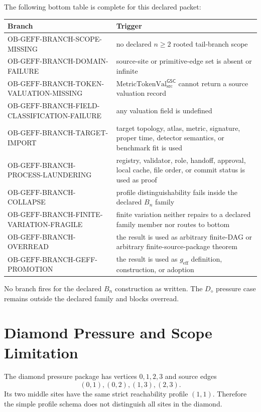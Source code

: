 \documentclass[11pt]{article}
\newcommand{\MetricTokenVal}{\mathrm{MetricTokenVal}_{\mathrm{src}}^{\mathsf{GSC}}}
\newcommand{\OBGEFF}{\mathrm{OB\mbox{-}GEFF}}
\newcommand{\geff}{g_{\mathrm{eff}}}
\newcommand{\Bn}{B_n}
\newcommand{\Diamond}{D_{\diamond}}
\begin{document}
The following bottom table is complete for this declared packet:
\begin{longtable}{p{}p{}}
\toprule
Branch & Trigger \\
\midrule
\(\OBGEFF\)-BRANCH-SCOPE-MISSING & no declared \(n\ge 2\) rooted tail-branch scope \\
\(\OBGEFF\)-BRANCH-DOMAIN-FAILURE & source-site or primitive-edge set is absent or infinite \\
\(\OBGEFF\)-BRANCH-TOKEN-VALUATION-MISSING & \(\MetricTokenVal\) cannot return a source valuation record \\
\(\OBGEFF\)-BRANCH-FIELD-CLASSIFICATION-FAILURE & any valuation field is undefined \\
\(\OBGEFF\)-BRANCH-TARGET-IMPORT & target topology, atlas, metric, signature, proper time, detector semantics, or benchmark fit is used \\
\(\OBGEFF\)-BRANCH-PROCESS-LAUNDERING & registry, validator, role, handoff, approval, local cache, file order, or commit status is used as proof \\
\(\OBGEFF\)-BRANCH-COLLAPSE & profile distinguishability fails inside the declared \(\Bn\) family \\
\(\OBGEFF\)-BRANCH-FINITE-VARIATION-FRAGILE & finite variation neither repairs to a declared family member nor routes to bottom \\
\(\OBGEFF\)-BRANCH-OVERREAD & the result is used as arbitrary finite-DAG or arbitrary finite-source-package theorem \\
\(\OBGEFF\)-BRANCH-GEFF-PROMOTION & the result is used as \(\geff\) definition, construction, or adoption \\
\bottomrule
\end{longtable}

No branch fires for the declared \(\Bn\) construction as written. The
\(\Diamond\) pressure case remains outside the declared family and blocks
overread.

\section{Diamond Pressure and Scope Limitation}
\label{diamond-pressure-and-scope-limitation}

The diamond pressure package has vertices \(0,1,2,3\) and source edges
\[
(0,1), (0,2), (1,3), (2,3).
\]
Its two middle sites have the same strict reachability profile \((1,1)\).
Therefore the simple profile schema does not distinguish all sites in the
diamond.
\end{document}
